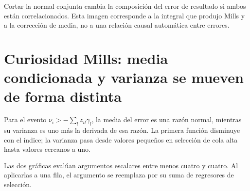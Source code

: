 \documentclass[11pt,a4paper]{article}
\begin{document}
Cortar la normal conjunta
cambia la composición
del error de resultado
si ambos están correlacionados.
Esta imagen corresponde
a la integral que
produjo Mills y a
la corrección de media,
no a una relación
causal automática entre errores.

\clearpage
\section{Curiosidad Mills: media condicionada y varianza se mueven de forma distinta}\label{unidad176}
Para el evento \(\nu_i>-\sum_lz_{il}\gamma_l\),
la media del error
es una razón normal,
mientras su varianza
es uno más la
derivada de esa razón.
La primera función
disminuye con el índice;
la varianza pasa desde
valores pequeños en
selección de cola alta
hasta valores cercanos a uno.

Las dos gráficas evalúan
argumentos escalares
entre menos cuatro y cuatro.
Al aplicarlas a una fila,
el argumento se reemplaza
por su suma de
regresores de selección.
\end{document}
